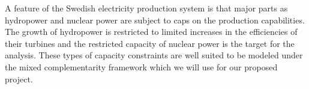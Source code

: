 A feature of the Swedish electricity production system is that major parts as hydropower and nuclear power are subject to caps on the production capabilities. The growth of hydropower is restricted to limited increases in the efficiencies of their turbines and the restricted capacity of nuclear power is the target for the analysis. These types of capacity constraints are well suited to be modeled under the mixed complementarity framework \citep{raey} which we will use for our proposed project.

\begin{comment}
\textbf{Modeling electricity sector}
Disaggregated electricity sector
- Coal, Gas, Oil, Nuclear, Hydro, Wind
- to incorporate natural resource constraints on hydro and wind, the expansions of wind and hydro power are bounded by the levels of hydro and wind resource factors, respectively.

\textbf{Scenarios}
- Scenario 1: Phase out of existing nuclear power (without expansion of hydro power plant)
- Scenario 2: Phase out of existing nuclear power plant (with expansion of hydro power plant)
- Scenario 3: Phase out of existing nuclear power plant (without expansion of hydro power plant) and CO2 commitment
- Scenario 4: Phase out of existing nuclear power plant (with expansion of hydro power plant) and CO2 commitment

\end{comment}





